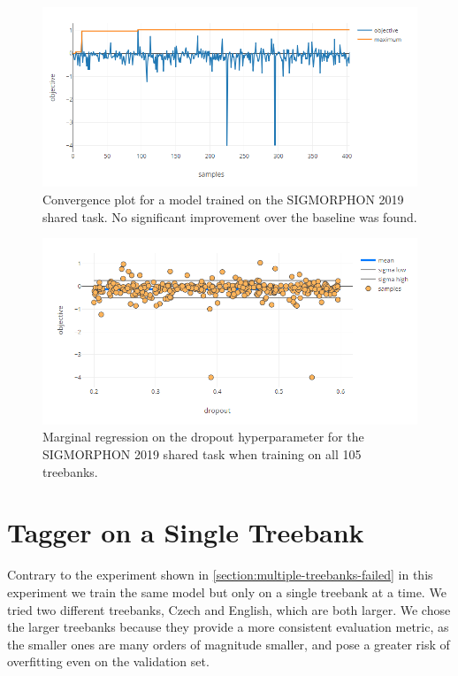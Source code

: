 \begin{figure}
	\begin{center}
		\includegraphics[width=1.0\textwidth]{images/sigmorphon-convergence.png}
		\caption{Convergence plot for a model trained on the SIGMORPHON 2019 shared task. No significant improvement over the baseline was found.}
		\label{figure:sigmorphon-convergence}
	\end{center}
\end{figure}

\begin{figure}
	\begin{center}
		\includegraphics[width=1.0\textwidth]{images/sigmorphon-dropout.png}
		\caption{Marginal regression on the dropout hyperparameter for the SIGMORPHON 2019 shared task when training on all 105 treebanks.}
		\label{figure:sigmorphon-dropout}
	\end{center}
\end{figure}


\section{Tagger on a Single Treebank}
\label{section:exp-cestina}

Contrary to the experiment shown in \autoref{section:multiple-treebanks-failed} in this experiment we train the same model but only on a single treebank at a time. We tried two different treebanks, Czech and English, which are both larger. We chose the larger treebanks because they provide a more consistent evaluation metric, as the smaller ones are many orders of magnitude smaller, and pose a greater risk of overfitting even on the validation set.

